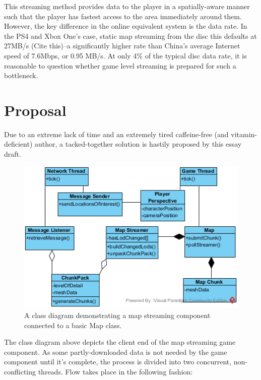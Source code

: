\documentclass{scrartcl}
\begin{document}
This streaming method provides data to the player in a spatially-aware manner such that the player has fastest access to the area immediately around them. However, the key difference in the online equivalent system is the data rate. In the PS4 and Xbox One's case, static map streaming from the disc this defaults at 27MB/s (Cite this)--a significantly higher rate than China's average Internet speed of 7.6Mbps, or 0.95 MB/s. At only 4\% of the typical disc data rate, it is reasonable to question whether game level streaming is prepared for such a bottleneck.

\section{Proposal}
Due to an extreme lack of time and an extremely tired caffeine-free (and vitamin-deficient) author, a tacked-together solution is hastily proposed by this essay draft.

\begin{figure}
	\includegraphics[width=0.7\linewidth]{Basic_Map_Streamer}
	\caption{A class diagram demonstrating a map streaming component connected to a basic Map class.}
	\label{fig:simplesystem}
\end{figure}

The class diagram above depicts the client end of the map streaming game component. As some partly-downloaded data is not needed by the game component until it's complete, the process is divided into two concurrent, non-conflicting threads. Flow takes place in the following fashion:
\end{document}
